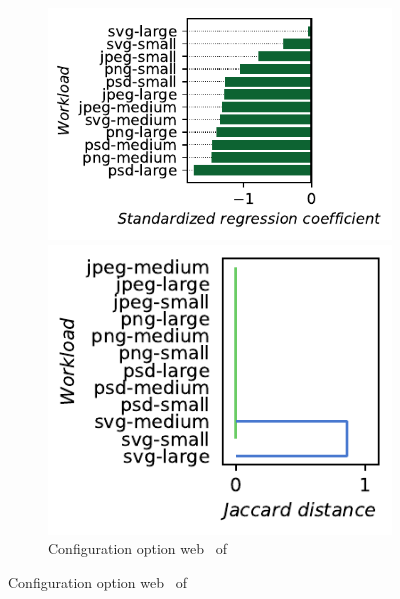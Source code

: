 \begin{figure}
	\begin{subfigure}{0.99\linewidth}
		\begin{minipage}{0.5\linewidth}
			\includegraphics[width=\linewidth]{images/plots/dconvert_web_influences.pdf}
		\end{minipage}
		\begin{minipage}{0.5\linewidth}
			\includegraphics[width=\linewidth]{images/plots/dconvert_web_workloads.pdf}
		\end{minipage}
		\caption{Configuration option \guillemotleft\textsf{web}\guillemotright~ of \dconvert}
		\label{fig:results_rq3_dconvert}
	\end{subfigure}
	

\end{figure}
